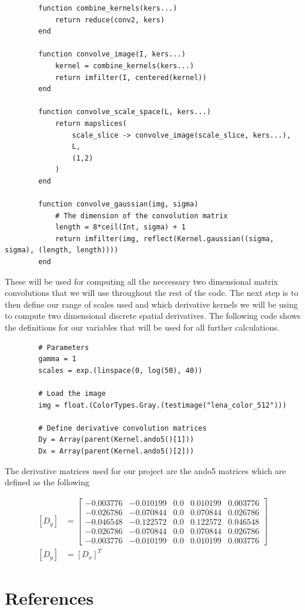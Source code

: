 \documentclass{article}
\begin{document}
    \begin{lstlisting}
        function combine_kernels(kers...)
            return reduce(conv2, kers)
        end

        function convolve_image(I, kers...)
            kernel = combine_kernels(kers...)
            return imfilter(I, centered(kernel))
        end

        function convolve_scale_space(L, kers...)
            return mapslices(
                scale_slice -> convolve_image(scale_slice, kers...),
                L,
                (1,2)
            )
        end

        function convolve_gaussian(img, sigma)
            # The dimension of the convolution matrix
            length = 8*ceil(Int, sigma) + 1
            return imfilter(img, reflect(Kernel.gaussian((sigma, sigma), (length, length))))
        end
    \end{lstlisting}

    These will be used for computing all the neccessary two dimensional matrix convolutions that we will use throughout the rest of the code. The next step is to then define our range of scales used and which derivative kernels we will be using to compute two dimensional discrete spatial derivatives. The following code shows the definitions for our variables that will be used for all further calculations. 

    \begin{lstlisting}
        # Parameters
        gamma = 1
        scales = exp.(linspace(0, log(50), 40))

        # Load the image
        img = float.(ColorTypes.Gray.(testimage("lena_color_512")))

        # Define derivative convolution matrices
        Dy = Array(parent(Kernel.ando5()[1]))
        Dx = Array(parent(Kernel.ando5()[2]))
    \end{lstlisting}

    The derivative matrices used for our project are the ando5 matrices which are defined as the following

    \begin{equation}
        \begin{aligned}
        [D_y] &=
        \begin{bmatrix}
            -0.003776 &-0.010199  &0.0  &0.010199  &0.003776 \\
            -0.026786 &-0.070844  &0.0  &0.070844  &0.026786 \\
            -0.046548 &-0.122572  &0.0  &0.122572  &0.046548 \\
            -0.026786 &-0.070844  &0.0  &0.070844  &0.026786 \\
            -0.003776 &-0.010199  &0.0  &0.010199  &0.003776
        \end{bmatrix} \\
        [D_y] &= [D_x]^T
        \end{aligned}
    \end{equation}  
\section*{References}
\end{document}

